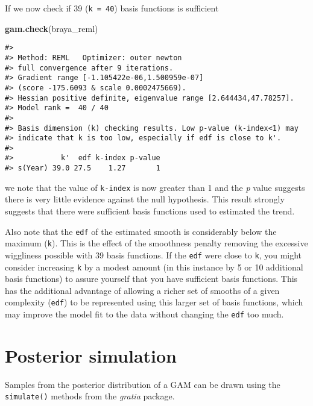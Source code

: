 \documentclass[12pt,]{article}
\newenvironment{Shaded}{\begin{snugshade}}{\end{snugshade}}
\newcommand{\KeywordTok}[1]{\textcolor[rgb]{0.13,0.29,0.53}{\textbf{#1}}}
\newcommand{\NormalTok}[1]{#1}
\begin{document}
If we now check if 39 (\texttt{k\ =\ 40}) basis functions is sufficient

\begin{Shaded}
\begin{Highlighting}[]
\KeywordTok{gam.check}\NormalTok{(braya_reml)}
\end{Highlighting}
\end{Shaded}

\begin{verbatim}
#> 
#> Method: REML   Optimizer: outer newton
#> full convergence after 9 iterations.
#> Gradient range [-1.105422e-06,1.500959e-07]
#> (score -175.6093 & scale 0.0002475669).
#> Hessian positive definite, eigenvalue range [2.644434,47.78257].
#> Model rank =  40 / 40 
#> 
#> Basis dimension (k) checking results. Low p-value (k-index<1) may
#> indicate that k is too low, especially if edf is close to k'.
#> 
#>           k'  edf k-index p-value
#> s(Year) 39.0 27.5    1.27       1
\end{verbatim}

we note that the value of \texttt{k-index} is now greater than 1 and the
\emph{p} value suggests there is very little evidence against the null
hypothesis. This result strongly suggests that there were sufficient
basis functions used to estimated the trend.

Also note that the \texttt{edf} of the estimated smooth is considerably
below the maximum (\texttt{k\textquotesingle{}}). This is the effect of
the smoothness penalty removing the excessive wiggliness possible with
39 basis functions. If the \texttt{edf} were close to
\texttt{k\textquotesingle{}}, you might consider increasing \texttt{k}
by a modest amount (in this instance by 5 or 10 additional basis
functions) to assure yourself that you have sufficient basis functions.
This has the additional advantage of allowing a richer set of smooths of
a given complexity (\texttt{edf}) to be represented using this larger
set of basis functions, which may improve the model fit to the data
without changing the \texttt{edf} too much.

\hypertarget{posterior-simulation}{%
\section{Posterior simulation}\label{posterior-simulation}}

Samples from the posterior distribution of a GAM can be drawn using the
\texttt{simulate()} methods from the \emph{gratia} package.
\end{document}
